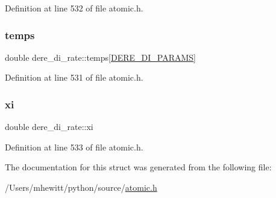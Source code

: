 Definition at line 532 of file atomic.\+h.

\mbox{\label{structdere__di__rate_a3018944b5c151094bad854661eb7aa31}} 
\subsubsection{\texorpdfstring{temps}{temps}}
{\footnotesize\ttfamily double dere\+\_\+di\+\_\+rate\+::temps\mbox{[}\hyperlink{atomic_8h_aefebf0841dbe3a3fded75a69142f8fa2}{D\+E\+R\+E\+\_\+\+D\+I\+\_\+\+P\+A\+R\+A\+MS}\mbox{]}}



Definition at line 531 of file atomic.\+h.

\mbox{\label{structdere__di__rate_a356c84714c48be9df082926edf7c4dc9}} 
\subsubsection{\texorpdfstring{xi}{xi}}
{\footnotesize\ttfamily double dere\+\_\+di\+\_\+rate\+::xi}



Definition at line 533 of file atomic.\+h.



The documentation for this struct was generated from the following file\+:\begin{DoxyCompactItemize}
\item 
/\+Users/mhewitt/python/source/\hyperlink{atomic_8h}{atomic.\+h}\end{DoxyCompactItemize}
